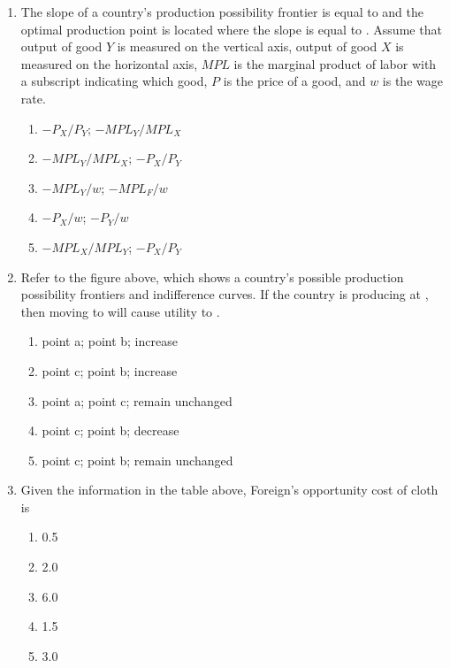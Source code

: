 \documentclass[12pt]{article}
\begin{document}
\begin{enumerate}[label=\textbf{\arabic*.}]
\item The slope of a country's production possibility frontier is equal to \underline{\hspace{2em}} and the optimal production point is located where the slope is equal to \underline{\hspace{2em}}. Assume that output of good $Y$ is measured on the vertical axis, output of good $X$ is measured on the horizontal axis, $MPL$ is the marginal product of labor with a subscript indicating which good, $P$ is the price of a good, and $w$ is the wage rate.
\begin{enumerate}[label=\Alph*.]
\item $-P_X/P_Y$; $-MPL_Y/MPL_X$
\item $-MPL_Y/MPL_X$; $-P_X/P_Y$
\item $-MPL_Y/w$; $-MPL_F/w$
\item $-P_X/w$; $-P_Y/w$
\item $-MPL_X/MPL_Y$; $-P_X/P_Y$
\end{enumerate}

\item Refer to the figure above, which shows a country's possible production possibility frontiers and indifference curves. If the country is producing at \underline{\hspace{2em}}, then moving to \underline{\hspace{2em}} will cause utility to \underline{\hspace{2em}}.
\begin{enumerate}[label=\Alph*.]
\item point a; point b; increase
\item point c; point b; increase
\item point a; point c; remain unchanged
\item point c; point b; decrease
\item point c; point b; remain unchanged
\end{enumerate}


\item Given the information in the table above, Foreign's opportunity cost of cloth is
\begin{enumerate}[label=\Alph*.]
\item 0.5
\item 2.0
\item 6.0
\item 1.5
\item 3.0
\end{enumerate}


\end{enumerate}
\end{document}
